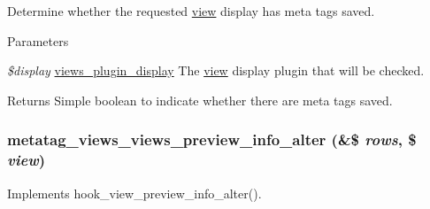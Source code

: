 \label{metatag__views_8module_aaff22581f126c9d9c3dc9a7fc13a5c62}
Determine whether the requested \hyperlink{classview}{view} display has meta tags saved.


\begin{DoxyParams}{Parameters}
\item[{\em \$display}]\hyperlink{classviews__plugin__display}{views\_\-plugin\_\-display} The \hyperlink{classview}{view} display plugin that will be checked.\end{DoxyParams}
\begin{DoxyReturn}{Returns}
Simple boolean to indicate whether there are meta tags saved. 
\end{DoxyReturn}
\hypertarget{metatag__views_8module_a562122ccf416b8a9ea62e89474d6f030}{
\subsubsection[{metatag\_\-views\_\-views\_\-preview\_\-info\_\-alter}]{\setlength{\rightskip}{0pt plus 5cm}metatag\_\-views\_\-views\_\-preview\_\-info\_\-alter (\&\$ {\em rows}, \/  \$ {\em view})}}
\label{metatag__views_8module_a562122ccf416b8a9ea62e89474d6f030}
Implements hook\_\-view\_\-preview\_\-info\_\-alter(). 
